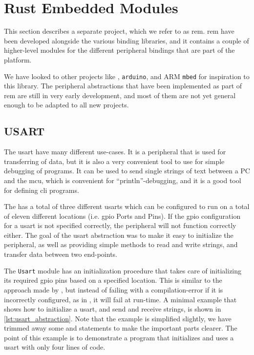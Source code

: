 
\section{Rust Embedded Modules}
\label{sec:rust-embedded-modules}

This section describes a separate project, which we refer to as \gls{rem}.
\gls{rem} have been developed alongside the various binding libraries, and it contains a couple of higher-level modules for the different peripheral bindings that are part of the {\rg} platform.

We have looked to other projects like {\zinc}, \texttt{arduino}, and ARM \texttt{mbed} for inspiration to this library.
The peripheral abstractions that have been implemented as part of \gls{rem} are still in very early development, and most of them are not yet general enough to be adapted to all new projects.

\subsection{USART}
\label{ssub:usart}

The \gls{usart} have many different use-cases.
It is a peripheral that is used for transferring of data, but it is also a very convenient tool to use for simple debugging of programs.
It can be used to send single strings of text between a PC and the \gls{mcu}, which is convenient for ``println''-debugging, and it is a good tool for defining \gls{cli} programs.

The {\gecko} has a total of three different \glspl{usart} which can be configured to run on a total of eleven different locations (i.e. \gls{gpio} Ports and Pins).
If the \gls{gpio} configuration for a \gls{usart}  is not specified correctly, the peripheral will not function correctly either.
The goal of the \gls{usart} abstraction was to make it easy to initialize the peripheral, as well as providing simple methods to read and write strings, and transfer data between two end-points.

The \texttt{Usart} module has an initialization procedure that takes care of initializing its required \gls{gpio} pins based on a specified location.
This is similar to the approach made by {\zinc}, but instead of failing with a compilation-error if it is incorrectly configured, as in {\zinc}, it will fail at run-time.
A minimal example that shows how to initialize a \gls{usart}, and send and receive strings, is shown in \autoref{lst:usart_abstraction}.
Note that the example is simplified slightly, we have trimmed away some  and  statements to make the important parts clearer.
The point of this example is to demonstrate a program that initializes and uses a \gls{usart} with only four lines of code.


